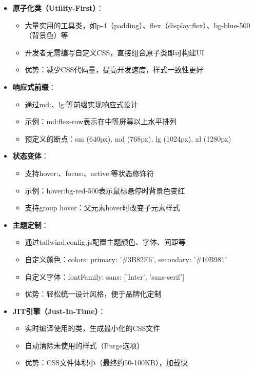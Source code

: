\documentclass[12pt,a4paper]{article}
\begin{document}
\begin{itemize}
    \item \textbf{原子化类（Utility-First）}：
        \begin{itemize}
            \item 大量实用的工具类，如p-4（padding）、flex（display:flex）、bg-blue-500（背景色）等
            \item 开发者无需编写自定义CSS，直接组合原子类即可构建UI
            \item 优势：减少CSS代码量，提高开发速度，样式一致性更好
        \end{itemize}
    \item \textbf{响应式前缀}：
        \begin{itemize}
            \item 通过md:、lg:等前缀实现响应式设计
            \item 示例：md:flex-row表示在中等屏幕以上水平排列
            \item 预定义的断点：sm (640px), md (768px), lg (1024px), xl (1280px)
        \end{itemize}
    \item \textbf{状态变体}：
        \begin{itemize}
            \item 支持hover:、focus:、active:等状态修饰符
            \item 示例：hover:bg-red-500表示鼠标悬停时背景色变红
            \item 支持group hover：父元素hover时改变子元素样式
        \end{itemize}
    \item \textbf{主题定制}：
        \begin{itemize}
            \item 通过tailwind.config.js配置主题颜色、字体、间距等
            \item 自定义颜色：colors: { primary: '\#3B82F6', secondary: '\#10B981' }
            \item 自定义字体：fontFamily: { sans: ['Inter', 'sans-serif'] }
            \item 优势：轻松统一设计风格，便于品牌化定制
        \end{itemize}
    \item \textbf{JIT引擎（Just-In-Time）}：
        \begin{itemize}
            \item 实时编译使用的类，生成最小化的CSS文件
            \item 自动清除未使用的样式（Purge选项）
            \item 优势：CSS文件体积小（最终约50-100KB），加载快
        \end{itemize}
\end{itemize}
\end{document}
